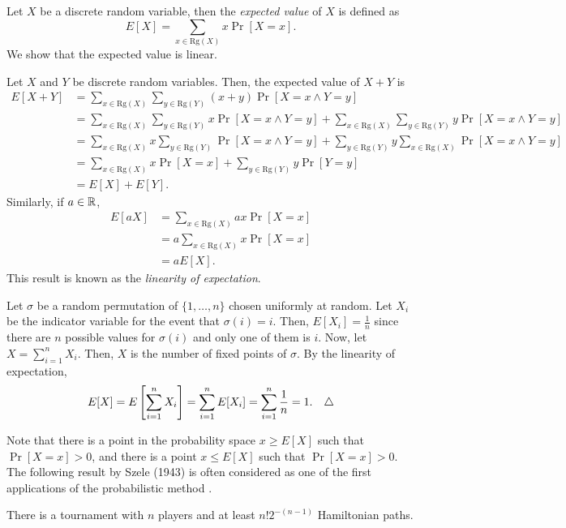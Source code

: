Let $X$ be a discrete random variable, then the \textit{expected value} of $X$ is defined as 
\[E[X] = \sum_{x \in \text{Rg}(X)} x\Pr[X = x].\]
We show that the expected value is linear. \par
Let $X$ and $Y$ be discrete random variables. Then, the expected value of $X + Y$ is
\begin{align*}
    E[X + Y] &= \sum_{x \in \text{Rg}(X)} \sum_{y \in \text{Rg}(Y)} (x + y)\Pr[X = x \wedge Y = y] \\
    &= \sum_{x \in \text{Rg}(X)} \sum_{y \in \text{Rg}(Y)} x\Pr[X = x \wedge Y = y] + \sum_{x \in \text{Rg}(X)} \sum_{y \in \text{Rg}(Y)} y\Pr[X = x \wedge Y = y] \\
    &= \sum_{x \in \text{Rg}(X)} x\sum_{y \in \text{Rg}(Y)} \Pr[X = x \wedge Y = y] + \sum_{y \in \text{Rg}(Y)} y\sum_{x \in \text{Rg}(X)} \Pr[X = x \wedge Y = y] \\
    &= \sum_{x \in \text{Rg}(X)} x\Pr[X = x] + \sum_{y \in \text{Rg}(Y)} y\Pr[Y = y] \\
    &= E[X] + E[Y].
\end{align*}
Similarly, if $a \in \mathbb{R}$,
\begin{align*}
    E[aX] &= \sum_{x \in \text{Rg}(X)} ax\Pr[X = x] \\
    &= a\sum_{x \in \text{Rg}(X)} x\Pr[X = x] \\
    &= aE[X].
\end{align*}
This result is known as the \textit{linearity of expectation}. 
\begin{example}\label{ex:probmet:linearity}\cite{alon2016probabilistic}
    Let $\sigma$ be a random permutation of $\{1, \ldots, n\}$ chosen uniformly at random. Let $X_i$ be the indicator variable for the event that $\sigma(i) = i$. Then, $E[X_i] = \frac{1}{n}$ since there are $n$ possible values for $\sigma(i)$ and only one of them is $i$. Now, let $X = \sum_{i = 1}^n X_i$. Then, $X$ is the number of fixed points of $\sigma$. By the linearity of expectation,
    \[E[X] = E\left[\sum_{i = 1}^n X_i\right] = \sum_{i = 1}^n E[X_i] = \sum_{i = 1}^n \frac{1}{n} = 1.\tqed\]
\end{example}
Note that there is a point in the probability space $x \geq E[X]$ such that $\Pr[X = x] > 0$, and there is a point $x \leq E[X]$ such that $\Pr[X = x] > 0$. The following result by Szele (1943) is often considered as one of the first applications of the probabilistic method \cite{alon2016probabilistic}. \par
\begin{theorem}
    There is a tournament with $n$ players and at least $n!2^{-(n - 1)}$ Hamiltonian paths. \cite{alon2016probabilistic}
\end{theorem}
